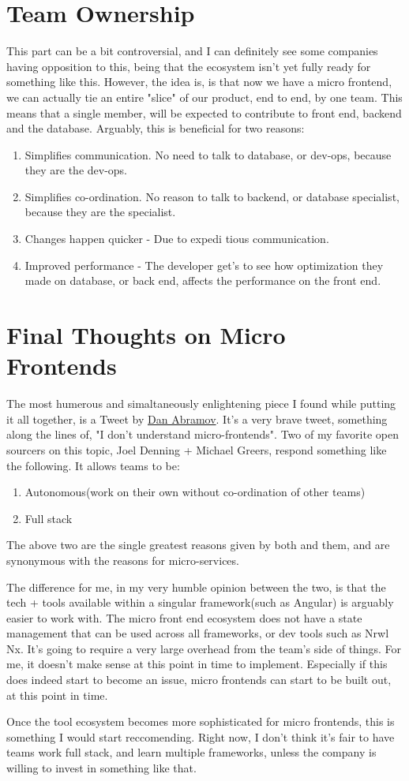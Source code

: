 \section{Team Ownership}
This part can be a bit controversial, and I can definitely see some companies having opposition to this, being that the ecosystem isn't yet fully ready for something like this. However, the idea is, is that now we have a micro frontend, we can actually tie an entire "slice" of our product, end to end, by one team. This means that a single member, will be expected to contribute to front end, backend and the database. Arguably, this is beneficial for two reasons: 
\begin{enumerate}
  \item Simplifies communication. No need to talk to database, or dev-ops, because they are the dev-ops. 
  \item Simplifies co-ordination. No reason to talk to backend, or database specialist, because they are the specialist. 
  \item Changes happen quicker - Due to expedi  tious communication.
  \item Improved performance - The developer get's to see how optimization they made on database, or back end, affects the performance on the front end. 
\end{enumerate}

\section{Final Thoughts on Micro Frontends}
The most humerous and simaltaneously enlightening piece I found while putting it all together, is a Tweet by \href{twitter.com/dan_abramov/status/1132493678730252288?s=20}{Dan Abramov}. It's a very brave tweet, something along the lines of, "I don't understand micro-frontends". Two of my favorite open sourcers on this topic, Joel Denning + Michael Greers, respond something like the following. It allows teams to be:
\begin{enumerate}
  \item Autonomous(work on their own without co-ordination of other teams)
  \item Full stack
\end{enumerate}

The above two are the single greatest reasons given by both and them, and are synonymous with the reasons for micro-services.

The difference for me, in my very humble opinion between the two, is that the tech + tools available within a singular framework(such as Angular) is arguably easier to work with. The micro front end ecosystem does not have a state management that can be used across all frameworks, or dev tools such as Nrwl Nx. It's going to require a very large overhead from the team's side of things. For me, it doesn't make sense at this point in time to implement. Especially if this does indeed start to become an issue, micro frontends can start to be built out, at this point in time. 

Once the tool ecosystem becomes more sophisticated for micro frontends, this is something I would start reccomending. Right now, I don't think it's fair to have teams work full stack, and learn multiple frameworks, unless the company is willing to invest in something like that.
